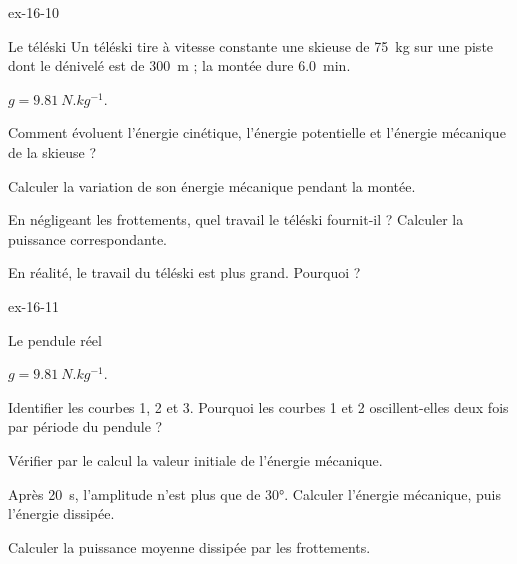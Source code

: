 \begin{blocLivre}{ex-16-10}
\begin{exercice}[2]{Le téléski}
Un téléski tire à vitesse constante une skieuse de \qty{75}{kg} sur une piste dont le dénivelé est de \qty{300}{m} ; la montée dure \qty{6,0}{min}.
\begin{donnees}
$g=\qty{9,81}{N.kg^{-1}}$.
\end{donnees}
\begin{questions}
\item Comment évoluent l'énergie cinétique, l'énergie potentielle et l'énergie mécanique de la skieuse ?
\item Calculer la variation de son énergie mécanique pendant la montée.
\item En négligeant les frottements, quel travail le téléski fournit-il ? Calculer la puissance correspondante.
\item En réalité, le travail du téléski est plus grand. Pourquoi ?
\end{questions}
\end{exercice}
\end{blocLivre}
\begin{blocLivre}{ex-16-11}
\begin{exercice}[2]{Le pendule réel}
\begin{donnees}
$g=\qty{9,81}{N.kg^{-1}}$.
\end{donnees}
\begin{questions}
\item Identifier les courbes 1, 2 et 3. Pourquoi les courbes 1 et 2 oscillent-elles deux fois par période du pendule ?
\item Vérifier par le calcul la valeur initiale de l'énergie mécanique.
\item Après \qty{20}{s}, l'amplitude n'est plus que de \ang{30}. Calculer l'énergie mécanique, puis l'énergie dissipée.
\item Calculer la puissance moyenne dissipée par les frottements.
\end{questions}
\end{exercice}
\end{blocLivre}
